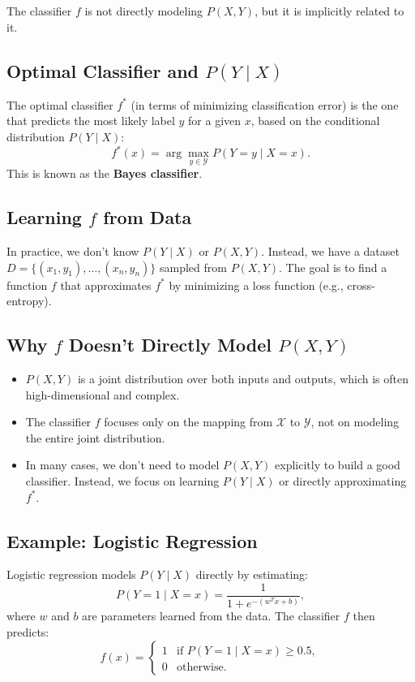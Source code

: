 \begin{notechapter}
The classifier \( f \) is not directly modeling \( P(X, Y) \), but it is implicitly related to it.

\subsection{Optimal Classifier and \( P(Y \mid X) \)}
The optimal classifier \( f^* \) (in terms of minimizing classification error) is the one that predicts the most likely label \( y \) for a given \( x \), based on the conditional distribution \( P(Y \mid X) \):
\[
f^*(x) = \arg\max_{y \in \mathcal{Y}} P(Y = y \mid X = x).
\]
This is known as the \textbf{Bayes classifier}.

\subsection{Learning \( f \) from Data}
In practice, we don't know \( P(Y \mid X) \) or \( P(X, Y) \). Instead, we have a dataset \( D = \{(x_1, y_1), \dots, (x_n, y_n)\} \) sampled from \( P(X, Y) \). The goal is to find a function \( f \) that approximates \( f^* \) by minimizing a loss function (e.g., cross-entropy).

\subsection{Why \( f \) Doesn't Directly Model \( P(X, Y) \)}
\begin{itemize}
    \item \( P(X, Y) \) is a joint distribution over both inputs and outputs, which is often high-dimensional and complex.
    \item The classifier \( f \) focuses only on the mapping from \( \mathcal{X} \) to \( \mathcal{Y} \), not on modeling the entire joint distribution.
    \item In many cases, we don't need to model \( P(X, Y) \) explicitly to build a good classifier. Instead, we focus on learning \( P(Y \mid X) \) or directly approximating \( f^* \).
\end{itemize}

\subsection{Example: Logistic Regression}
Logistic regression models \( P(Y \mid X) \) directly by estimating:
\[
P(Y = 1 \mid X = x) = \frac{1}{1 + e^{-(w^T x + b)}},
\]
where \( w \) and \( b \) are parameters learned from the data. The classifier \( f \) then predicts:
\[
f(x) = \begin{cases}
1 & \text{if } P(Y = 1 \mid X = x) \geq 0.5, \\
0 & \text{otherwise}.
\end{cases}
\]


\end{notechapter}
